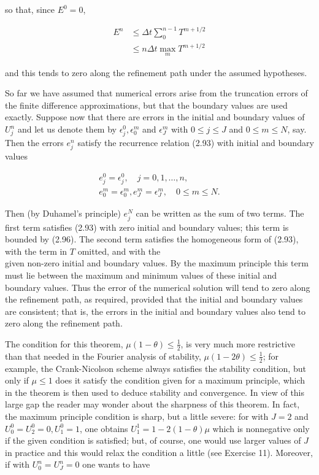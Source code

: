 \documentclass[10pt]{article}
\begin{document}
so that, since \(E^{0}=0\),

\[
\begin{aligned}
E^{n} & \leq \Delta t \sum_{0}^{n-1} T^{m+1 / 2} \\
& \leq n \Delta t \max _{m} T^{m+1 / 2}
\end{aligned}
\]

and this tends to zero along the refinement path under the assumed hypotheses.

So far we have assumed that numerical errors arise from the truncation errors of the finite difference approximations, but that the boundary values are used exactly. Suppose now that there are errors in the initial and boundary values of \(U_{j}^{n}\) and let us denote them by \(\epsilon_{j}^{0}, \epsilon_{0}^{m}\) and \(\epsilon_{J}^{m}\) with \(0 \leq j \leq J\) and \(0 \leq m \leq N\), say. Then the errors \(e_{j}^{n}\) satisfy the recurrence relation (2.93) with initial and boundary values

\[
\begin{gathered}
e_{j}^{0}=\epsilon_{j}^{0}, \quad j=0,1, \ldots, n, \\
e_{0}^{m}=\epsilon_{0}^{m}, e_{J}^{m}=\epsilon_{J}^{m}, \quad 0 \leq m \leq N .
\end{gathered}
\]

Then (by Duhamel's principle) \(e_{j}^{N}\) can be written as the sum of two terms. The first term satisfies (2.93) with zero initial and boundary values; this term is bounded by (2.96). The second term satisfies the homogeneous form of (2.93), with the term in \(T\) omitted, and with the\\
given non-zero initial and boundary values. By the maximum principle this term must lie between the maximum and minimum values of these initial and boundary values. Thus the error of the numerical solution will tend to zero along the refinement path, as required, provided that the initial and boundary values are consistent; that is, the errors in the initial and boundary values also tend to zero along the refinement path.

The condition for this theorem, \(\mu(1-\theta) \leq \frac{1}{2}\), is very much more restrictive than that needed in the Fourier analysis of stability, \(\mu(1- 2 \theta) \leq \frac{1}{2}\); for example, the Crank-Nicolson scheme always satisfies the stability condition, but only if \(\mu \leq 1\) does it satisfy the condition given for a maximum principle, which in the theorem is then used to deduce stability and convergence. In view of this large gap the reader may wonder about the sharpness of this theorem. In fact, the maximum principle condition is sharp, but a little severe: for with \(J=2\) and \(U_{0}^{0}=U_{2}^{0}=0, U_{1}^{0}=1\), one obtains \(U_{1}^{1}=1-2(1-\theta) \mu\) which is nonnegative only if the given condition is satisfied; but, of course, one would use larger values of \(J\) in practice and this would relax the condition a little (see Exercise 11). Moreover, if with \(U_{0}^{n}=U_{J}^{n}=0\) one wants to have
\end{document}
